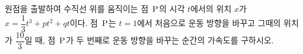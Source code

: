 원점을 출발하여 수직선 위를 움직이는 점~$\mathrm{P}$의 시각 $t$에서의 위치 $x$가 $x=\dfrac{1}{3}t^3+pt^2+qt$이다. 점~$\mathrm{P}$는 $t=1$에서 처음으로 운동 방향을 바꾸고 그때의 위치가 $\dfrac{10}{3}$일 때, 점~$\mathrm{P}$가 두 번째로 운동 방향을 바꾸는 순간의 가속도를 구하시오. 
